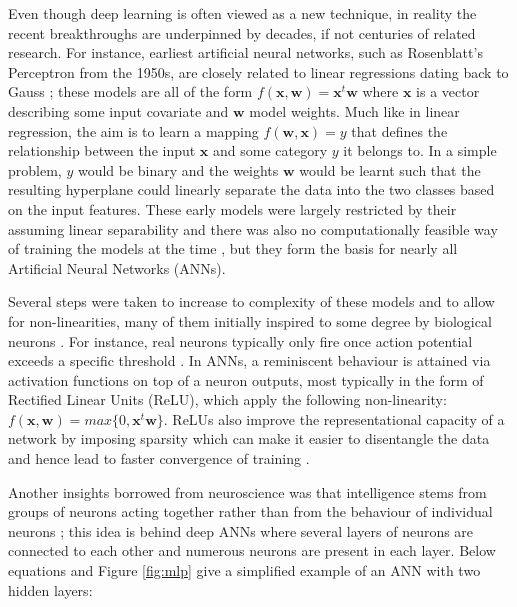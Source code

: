 \documentclass[12pt]{report}
\begin{document}
Even though deep learning is often viewed as a new technique, in reality the recent breakthroughs are underpinned by decades, if not centuries of related research. For instance, earliest artificial neural networks, such as Rosenblatt's Perceptron \cite{Rosenblatt1958} from the 1950s, are closely related to linear regressions dating back to Gauss \cite{JurgenSchmidhuber2015}; these models are all of the form $f(\mathbf{x}, \mathbf{w})=\mathbf{x}^t \mathbf{w}$ where $\mathbf{x}$ is a vector describing some input covariate and $\mathbf{w}$ model weights. Much like in linear regression, the aim is to learn a mapping $f(\mathbf{w}, \mathbf{x}) = y$ that defines the relationship between the input $\mathbf{x}$ and some category $y$ it belongs to. In a simple problem,  $y$ would be binary and the weights $\mathbf{w}$ would be learnt such that the resulting hyperplane could linearly separate the data into the two classes based on the input features. These early models were largely restricted by their assuming linear separability and there was also no computationally feasible way of training the models at the time \cite{Goodfellow2016}, \cite{JurgenSchmidhuber2015} but they form the basis for nearly all Artificial Neural Networks (ANNs). 

Several steps were taken to increase to complexity of these models and to allow for non-linearities, many of them initially inspired to some degree by biological neurons \cite{Goodfellow16}. For instance, real neurons typically only fire once action potential exceeds a specific threshold \cite{Hodgkin1990}. In ANNs, a reminiscent behaviour is attained via activation functions on top of a neuron outputs, most typically in the form of Rectified Linear Units (ReLU), which apply the following non-linearity: $f(\mathbf{x}, \mathbf{w})=max\{0, \mathbf{x}^t \mathbf{w}\}$. ReLUs also improve the representational capacity of a network by imposing sparsity which can make it easier to disentangle the data \cite{Glorot2011} and hence lead to faster convergence of training \cite{Krizhevsky2012}.

Another insights borrowed from neuroscience was that intelligence stems from groups of neurons acting together rather than from the behaviour of individual neurons \cite{Goodfellow2016}; this idea is behind deep ANNs where several layers of neurons are connected to each other and numerous neurons are present in each layer. Below equations and Figure \ref{fig:mlp} give a simplified example of an ANN with two hidden layers:
\end{document}
